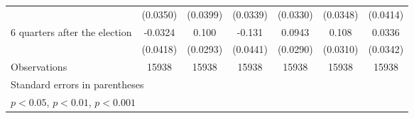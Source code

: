 \begin{table}[htbp]
\begin{tabular}{l*{6}{c}}
                    &    (0.0350)         &    (0.0399)         &    (0.0339)         &    (0.0330)         &    (0.0348)         &    (0.0414)         \\
[1em]
 6 quarters after the election&     -0.0324         &       0.100\sym{***}&      -0.131\sym{**} &      0.0943\sym{**} &       0.108\sym{***}&      0.0336         \\
                    &    (0.0418)         &    (0.0293)         &    (0.0441)         &    (0.0290)         &    (0.0310)         &    (0.0342)         \\
\hline
Observations        &       15938         &       15938         &       15938         &       15938         &       15938         &       15938         \\
\hline\hline
\multicolumn{7}{l}{\footnotesize Standard errors in parentheses}\\
\multicolumn{7}{l}{\footnotesize \sym{*} \(p<0.05\), \sym{**} \(p<0.01\), \sym{***} \(p<0.001\)}\\
\end{tabular}
\end{table}
